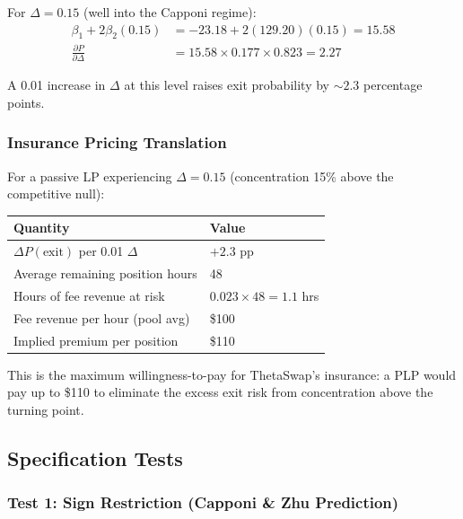 For $\Delta = 0.15$ (well into the Capponi regime):
\begin{align}
  \beta_1 + 2\beta_2(0.15) &= -23.18 + 2(129.20)(0.15) = 15.58
    \label{eq:marginal-015} \\
  \frac{\partial P}{\partial \Delta} &= 15.58 \times 0.177 \times 0.823
    = 2.27 \label{eq:marginal-value}
\end{align}

A 0.01 increase in $\Delta$ at this level raises exit probability by
${\sim}2.3$ percentage points.

\subsubsection{Insurance Pricing Translation}

For a passive LP experiencing $\Delta = 0.15$ (concentration 15\% above the
competitive null):

\begin{center}
\begin{tabular}{@{}ll@{}}
\toprule
Quantity & Value \\
\midrule
$\Delta P(\text{exit})$ per 0.01 $\Delta$ & $+2.3$ pp \\
Average remaining position hours & 48 \\
Hours of fee revenue at risk & $0.023 \times 48 = 1.1$ hrs \\
Fee revenue per hour (pool avg) & \$100 \\
Implied premium per position & \$110 \\
\bottomrule
\end{tabular}
\end{center}

This is the maximum willingness-to-pay for ThetaSwap's insurance: a PLP would
pay up to \$110 to eliminate the excess exit risk from concentration above the
turning point.


\subsection{Specification Tests}\label{subsec:econ-tests}

\subsubsection{Test 1: Sign Restriction (Capponi \& Zhu Prediction)}

